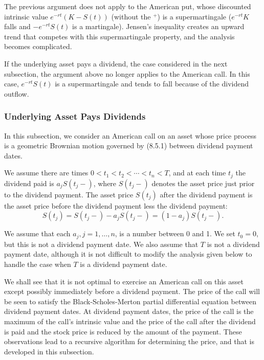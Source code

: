 The previous argument does not apply to the American put, whose discounted intrinsic value \(e^{-rt}(K - S(t))\) (without the \(^+\)) is a supermartingale (\(e^{-rt}K\) falls and \(-e^{-rt}S(t)\) is a martingale). Jensen's inequality creates an upward trend that competes with this supermartingale property, and the analysis becomes complicated.

If the underlying asset pays a dividend, the case considered in the next subsection, the argument above no longer applies to the American call. In this case, \(e^{-rt}S(t)\) is a supermartingale and tends to fall because of the dividend outflow.

\subsubsection{Underlying Asset Pays Dividends}

In this subsection, we consider an American call on an asset whose price process is a geometric Brownian motion governed by (8.5.1) between dividend payment dates.

We assume there are times \(0 < t_1 < t_2 < \cdots < t_n < T\), and at each time \(t_j\) the dividend paid is \(a_j S(t_j-)\), where \(S(t_j-)\) denotes the asset price just prior to the dividend payment. The asset price \(S(t_j)\) after the dividend payment is the asset price before the dividend payment less the dividend payment:
\begin{equation}
	S(t_j) = S(t_j-) - a_j S(t_j-) = (1 - a_j)S(t_j-). \label{eq:DividendAdjustment}
\end{equation}

We assume that each \(a_j, j=1,\dots,n\), is a number between 0 and 1. We set \(t_0 = 0\), but this is not a dividend payment date. We also assume that \(T\) is not a dividend payment date, although it is not difficult to modify the analysis given below to handle the case when \(T\) is a dividend payment date.

We shall see that it is not optimal to exercise an American call on this asset except possibly immediately before a dividend payment. The price of the call will be seen to satisfy the Black-Scholes-Merton partial differential equation between dividend payment dates. At dividend payment dates, the price of the call is the maximum of the call's intrinsic value and the price of the call after the dividend is paid and the stock price is reduced by the amount of the payment. These observations lead to a recursive algorithm for determining the price, and that is developed in this subsection.

